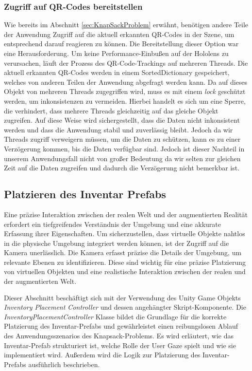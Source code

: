 \subsubsection{Zugriff auf QR-Codes bereitstellen}
Wie bereits im Abschnitt \ref{sec:KnapSackProblem} erwähnt, benötigen andere Teile der Anwendung Zugriff auf
die aktuell erkannten QR-Codes in der Szene, um entsprechend darauf reagieren zu können. Die Bereitstellung dieser Option war eine Herausforderung.
Um keine Performance-Einbußen auf der Hololens zu verursachen, läuft der Prozess des QR-Code-Trackings auf
mehreren Threads. Die aktuell erkannten QR-Codes werden in einem SortedDictionary gespeichert, welches von anderen Teilen
der Anwendung abgefragt werden kann. Da auf dieses Objekt von mehreren Threads zugegriffen wird, muss es mit einem
\textit{lock} geschützt werden, um inkonsistenzen zu vermeiden. Hierbei handelt es sich um eine Sperre, die verhindert,
dass mehrere Threads gleichzeitig auf das gleiche Objekt zugreifen. Auf diese Weise wird sichergestellt, dass die Daten
nicht inkonsistent werden und dass die Anwendung stabil und zuverlässig bleibt. Jedoch da wir Threads zugriff verweigern
müssen, um die Daten zu schützen, kann es zu einer Verzögerung kommen, bis die Daten verfügbar sind. Jedoch ist dieser
Nachteil in unserem Anwendungsfall nicht von großer Bedeutung da wir selten zur gleichen Zeit auf die Daten zugreifen und
dadurch die Verzögerung nicht bemerkbar ist.

\subsection{Platzieren des Inventar Prefabs}
Eine präzise Interaktion zwischen der realen Welt und der augmentierten Realität erfordert ein tiefgreifendes Verständnis
der Umgebung und eine akkurate Erfassung ihrer Eigenschaften. Um sicherzustellen, dass virtuelle Objekte nahtlos in die
physische Umgebung integriert werden können, ist der Zugriff auf die Kamera unerlässlich. Die Kamera erfasst präzise die
Details der Umgebung, um relevante Ebenen zu identifizieren. Diese sind wichtig für eine präzise Platzierung von virtuellen
Objekten und eine realistische Interaktion zwischen der realen und der augmentierten Welt.

Dieser Abschnitt beschäftigt sich mit der Verwendung des Unity Game Objekts \textit{Inventory Placement Controller} und
dessen angehängter Skript-Komponente. Die \textit{InventoryPlacementController} Klasse bildet die Grundlage für die korrekte
Platzierung des Inventar-Prefabs und gewährleistet einen reibungslosen Ablauf des Anwendungsszenarios des Knapsack-Problems.
Es wird erläutert, wie das Inventar-Prefab strukturiert ist, welche Rolle der User Gaze spielt und wie sie implementiert
wird. Außerdem wird die Logik zur Platzierung des Inventar-Prefabs ausführlich beschrieben.

